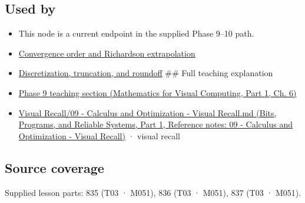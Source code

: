 \subsection{Used by}\label{appendix-80521eae6b71-used-by}

\hypertarget{appendix-80521eae6b71-used-by}{}

\begin{itemize}
\item
  This node is a current endpoint in the supplied Phase 9--10 path.
\item
  \hyperref[appendix-aca80b6bf17a]{Convergence order and Richardson extrapolation}
\item
  \hyperref[appendix-6b0648b2b8e8]{Discretization, truncation, and roundoff} \#\# Full teaching explanation
\item
  \href{../02-Mathematics-for-Visual-Computing-P01/main.pdf\#02-foundations-ii-ch022-integration-and-quadrature}{Phase 9 teaching section (Mathematics for Visual Computing, Part 1, Ch. 6)}
\item
  \href{../01-Bits-Programs-and-Reliable-Systems-P01/main.pdf\#appendix-adf48f5dc5c1}{Visual Recall/09 - Calculus and Optimization - Visual Recall.md (Bits, Programs, and Reliable Systems, Part 1, Reference notes: 09 - Calculus and Optimization - Visual Recall)} · visual recall
\end{itemize}

\subsection{Source coverage}\label{appendix-80521eae6b71-source-coverage}

\hypertarget{appendix-80521eae6b71-source-coverage}{}

Supplied lesson parts: 835 (T03 · M051), 836 (T03 · M051), 837 (T03 · M051).
